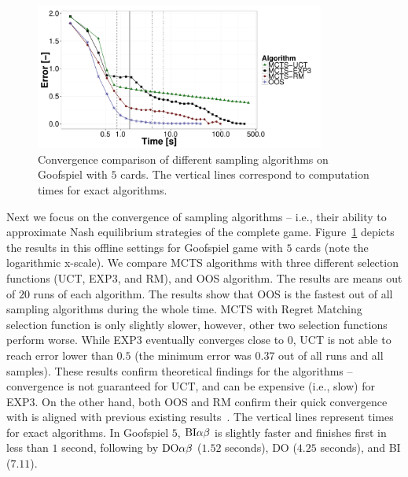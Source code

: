 \begin{figure}
\centering
\includegraphics[width=0.85\textwidth]{figures/convergence-gs.pdf}
\caption{Convergence comparison of different sampling algorithms on Goofspiel with $5$ cards. The vertical lines correspond to computation times for exact algorithms.} \label{fig:off:conv:gs}
\end{figure}

Next we focus on the convergence of sampling algorithms -- i.e., their ability to approximate Nash equilibrium strategies of the complete game. 
Figure~\ref{fig:off:conv:gs} depicts the results in this offline settings for Goofspiel game with $5$ cards (note the logarithmic x-scale).
We compare MCTS algorithms with three different selection functions (UCT, EXP3, and RM), and OOS algorithm. 
The results are means out of $20$ runs of each algorithm.
The results show that OOS is the fastest out of all sampling algorithms during the whole time. 
MCTS with Regret Matching selection function is only slightly slower, however, other two selection functions perform worse. 
While EXP3 eventually converges close to $0$, UCT is not able to reach error lower than $0.5$ (the minimum error was $0.37$ out of all runs and all samples).
These results confirm theoretical findings for the algorithms -- convergence is not guaranteed for UCT, and can be expensive (i.e., slow) for EXP3. 
On the other hand, both OOS and RM confirm their quick convergence with is aligned with previous existing results~\cite{}.
The vertical lines represent times for exact algorithms.
In Goofspiel $5$, $\textrm{BI}\alpha\beta$ is slightly faster and finishes first in less than $1$ second, following by $\textrm{DO}\alpha\beta$ ($1.52$ seconds), \textsc{DO} ($4.25$ seconds), and \textsc{BI} ($7.11$).


